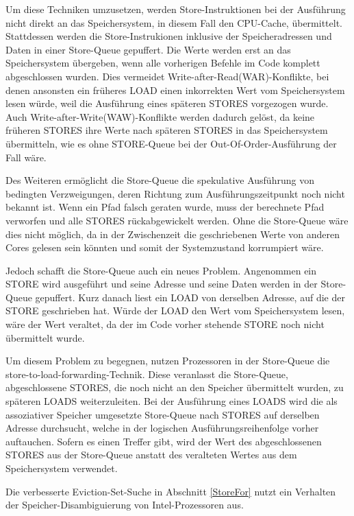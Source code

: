 Um diese Techniken umzusetzen, werden Store-Instruktionen bei der Ausführung nicht direkt an das Speichersystem, in diesem Fall den CPU-Cache, übermittelt.
Stattdessen werden die Store-Instrukionen inklusive der Speicheradressen und Daten in einer Store-Queue gepuffert.
Die Werte werden erst an das Speichersystem übergeben, wenn alle vorherigen Befehle im Code komplett abgeschlossen wurden.
Dies vermeidet Write-after-Read(WAR)-Konflikte, bei denen ansonsten ein früheres LOAD einen inkorrekten Wert vom Speichersystem lesen würde, weil die Ausführung eines späteren STORES vorgezogen wurde.
Auch Write-after-Write(WAW)-Konflikte werden dadurch gelöst, da keine früheren STORES ihre Werte nach späteren STORES in das Speichersystem übermitteln, wie es ohne STORE-Queue bei der Out-Of-Order-Ausführung der Fall wäre. 

Des Weiteren ermöglicht die Store-Queue die spekulative Ausführung von bedingten Verzweigungen, deren Richtung zum Ausführungszeitpunkt noch nicht bekannt ist.
Wenn ein Pfad falsch geraten wurde, muss der berechnete Pfad verworfen und alle STORES rückabgewickelt werden.
Ohne die Store-Queue wäre dies nicht möglich, da in der Zwischenzeit die geschriebenen Werte von anderen Cores gelesen sein könnten und somit der Systemzustand korrumpiert wäre.

Jedoch schafft die Store-Queue auch ein neues Problem.
Angenommen ein STORE wird ausgeführt und seine Adresse und seine Daten werden in der Store-Queue gepuffert. Kurz danach liest ein LOAD von derselben Adresse, auf die der STORE geschrieben hat.
Würde der LOAD den Wert vom Speichersystem lesen, wäre der Wert veraltet, da der im Code vorher stehende STORE noch nicht übermittelt wurde.

Um diesem Problem zu begegnen, nutzen Prozessoren in der Store-Queue die store-to-load-forwarding-Technik.
Diese veranlasst die Store-Queue, abgeschlossene STORES, die noch nicht an den Speicher übermittelt wurden, zu späteren LOADS weiterzuleiten.
Bei der Ausführung eines LOADS wird die als assoziativer Speicher umgesetzte Store-Queue nach STORES auf derselben Adresse durchsucht, welche in der logischen Ausführungsreihenfolge vorher auftauchen.
Sofern es einen Treffer gibt, wird der Wert des abgeschlossenen STORES aus der Store-Queue anstatt des veralteten Wertes aus dem Speichersystem verwendet.

Die verbesserte Eviction-Set-Suche in Abschnitt \ref{StoreFor} nutzt ein Verhalten der Speicher-Disambiguierung von Intel-Prozessoren aus.

